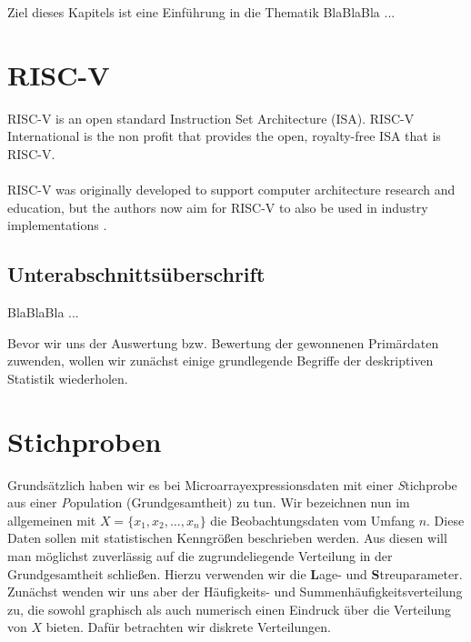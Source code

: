 
Ziel dieses Kapitels ist eine Einführung in die Thematik BlaBlaBla ...

\section{RISC-V}

RISC-V \cite{riscv} is an open standard Instruction Set Architecture (ISA).
RISC-V International is the non profit that provides the open, royalty-free ISA that is RISC-V.
\\\\
RISC-V was originally developed to support computer architecture research and education, but the authors now
aim for RISC-V to also be used in industry implementations \cite{riscv_spec}.

\subsection{Unterabschnittsüberschrift}

BlaBlaBla ...


Bevor wir uns der Auswertung bzw. Bewertung der gewonnenen Primärdaten zuwenden, wollen wir zunächst einige grundlegende Begriffe der deskriptiven Statistik wiederholen.
\section{Stichproben}

Grundsätzlich haben wir es bei Microarrayexpressionsdaten mit einer {\textit Stichprobe} aus einer {\textit Population (Grundgesamtheit)} zu tun.   
Wir bezeichnen nun im allgemeinen mit $X=\{x_1,x_2,\ldots,x_n\}$ die Beobachtungsdaten vom Umfang $n$. 
Diese Daten sollen mit statistischen Kenngrößen beschrieben werden. Aus diesen will man möglichst zuverlässig auf die zugrundeliegende Verteilung in der Grundgesamtheit schließen. Hierzu verwenden wir die {\textbf Lage-} und {\textbf Streuparameter}. Zunächst wenden wir uns aber der Häufigkeits- und Summenhäufigkeitsverteilung zu, die sowohl graphisch als auch numerisch einen Eindruck über die Verteilung von $X$ bieten. Dafür betrachten wir diskrete Verteilungen.

